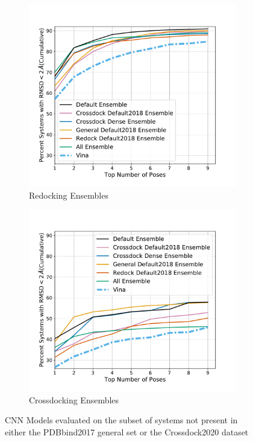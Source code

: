 \documentclass[journal=jcisd8,manuscript=article]{achemso}
\begin{document}
\begin{figure}    
        \begin{subfigure}[b]{0.48\textwidth}    
		\centering
		\includegraphics[width=\textwidth]{figures/redocking/ensemble_models_no2017_nocd2020_line.pdf}
		\caption{Redocking Ensembles}
		\label{fig:No2017NoCD20EnsRD}
        \end{subfigure}    
        \begin{subfigure}[b]{0.48\textwidth}    
		\centering
		\includegraphics[width=\textwidth]{figures/crossdocking/ensemble_models_no2017_nocd2020_line.pdf}
		\caption{Crossdocking Ensembles}
                \label{fig:No2017NoCD20EnsCD}
        \end{subfigure}
	\caption{CNN Models evaluated on the subset of systems not present in either the PDBbind2017 general set or the Crossdock2020 dataset}
	\label{fig:No2017NoCD20}
\end{figure}  
\end{document}
